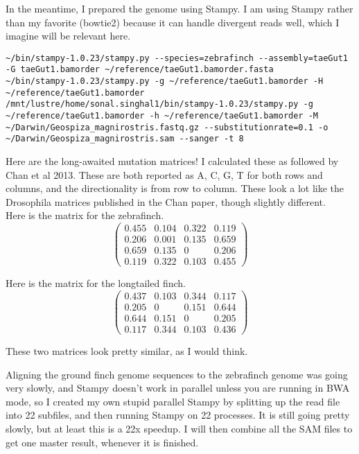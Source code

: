 \documentclass[idxtotoc,hyperref,openany,oneside]{labbook} %
\begin{document}
In the meantime, I prepared the genome using Stampy. I am using Stampy rather than my favorite (bowtie2) because it can handle divergent reads well, which I imagine will be relevant here. 
\begin{verbatim}
~/bin/stampy-1.0.23/stampy.py --species=zebrafinch --assembly=taeGut1 -G taeGut1.bamorder ~/reference/taeGut1.bamorder.fasta
~/bin/stampy-1.0.23/stampy.py -g ~/reference/taeGut1.bamorder -H ~/reference/taeGut1.bamorder
/mnt/lustre/home/sonal.singhal1/bin/stampy-1.0.23/stampy.py -g ~/reference/taeGut1.bamorder -h ~/reference/taeGut1.bamorder -M ~/Darwin/Geospiza_magnirostris.fastq.gz --substitutionrate=0.1 -o ~/Darwin/Geospiza_magnirostris.sam --sanger -t 8
\end{verbatim}

Here are the long-awaited mutation matrices! I calculated these as followed by Chan et al 2013. These are both reported as A, C, G, T for both rows and columns, and the directionality is from row to column. These look a lot like the Drosophila matrices published in the Chan paper, though slightly different. \\

Here is the matrix for the zebrafinch.
\[ \left( \begin{array}{cccc}
0.455 & 0.104 & 0.322 & 0.119 \\
0.206 & 0.001 & 0.135 & 0.659 \\
0.659 & 0.135 & 0 & 0.206 \\
0.119 & 0.322 & 0.103 & 0.455 \end{array} \right) \] 

Here is the matrix for the longtailed finch.
\[ \left( \begin{array}{cccc}
0.437 & 0.103 & 0.344 & 0.117 \\
0.205 & 0 & 0.151 & 0.644 \\
0.644 & 0.151 & 0 & 0.205 \\
0.117 & 0.344 & 0.103 & 0.436 \end{array} \right) \] 

These two matrices look pretty similar, as I would think.



Aligning the ground finch genome sequences to the zebrafinch genome was going very slowly, and Stampy doesn't work in parallel unless you are running in BWA mode, so I created my own stupid parallel Stampy by splitting up the read file into 22 subfiles, and then running Stampy on 22 processes. It is still going pretty slowly, but at least this is a 22x speedup. I will then combine all the SAM files to get one master result, whenever it is finished. \\
\end{document}
